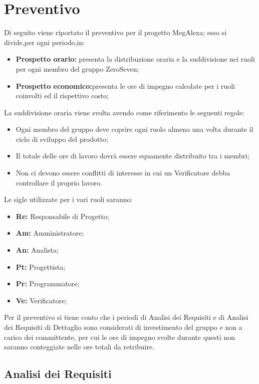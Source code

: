 \chapter{Preventivo}
Di seguito viene riportato il preventivo per il progetto MegAlexa; esso si divide,per ogni periodo,in:
\begin{itemize}
	\item \textbf{Prospetto orario:} presenta la distribuzione oraria e la suddivisione nei ruoli per ogni membro del gruppo ZeroSeven;
	\item \textbf{Prospetto economico:}presenta le ore di impegno calcolate per i ruoli coinvolti ed il rispettivo costo;
\end{itemize}
La suddivisione oraria viene svolta avendo come riferimento le seguenti regole:
\begin{itemize}
	\item Ogni membro del gruppo deve coprire ogni ruolo almeno una volta durante il ciclo di sviluppo del prodotto;
	\item Il totale delle ore di lavoro dovrà essere equamente distribuito tra i membri;
	\item Non ci devono essere conflitti di interesse in cui un Verificatore debba controllare il proprio lavoro.
\end{itemize}
Le sigle utilizzate per i vari ruoli saranno:
\begin{itemize}
	\item \textbf{Re:} Responsabile di Progetto;
	\item \textbf{Am:} Amministratore;
	\item \textbf{An:} Analista;
	\item \textbf{Pt:} Progettista;
	\item \textbf{Pr:} Programmatore;
	\item \textbf{Ve:} Verificatore;
\end{itemize}

Per il preventivo si tiene conto che i periodi di Analisi dei Requisiti e di Analisi dei Requisiti di Dettaglio sono considerati di investimento del gruppo e  non a carico dei committente, per cui  le ore di impegno svolte durante questi non saranno conteggiate nelle ore totali da retribuire.

\newpage
\section{Analisi  dei Requisiti}
